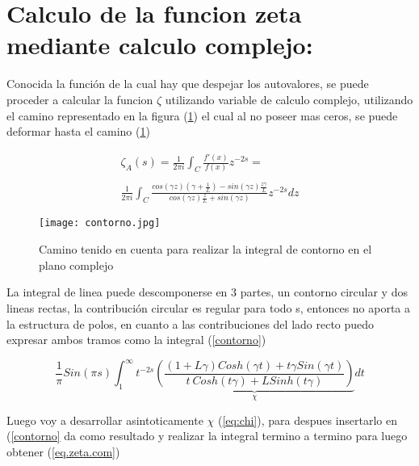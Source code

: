 \section{Calculo de la funcion zeta mediante calculo complejo:}

Conocida la función de la cual hay que despejar los autovalores, se puede proceder a calcular la funcion $\zeta$ utilizando variable de calculo complejo, utilizando el camino representado en la figura (\ref{fig:contorno}) el cual al no poseer mas ceros, se puede deformar hasta el camino (\ref{fig:contorno}) 

\begin{equation}
\begin{array}{c}
   \zeta _A (s) =  \frac{1}{2 \pi i} \int _{C} \frac{f'(x)}{f(x)} z ^{-2s} = \\ 
   \\ 
    \frac{1}{2 \pi i} \int _{C}
    \frac{ cos(\gamma z) \left(\gamma + \frac{1}{L} \right) - sin(\gamma z) \frac{z \gamma}{L}
    }
    {cos(\gamma z) \frac{z}{L} + sin(\gamma z)
    }
    z ^{-2 s} dz
\end{array}
\end{equation}




\begin{figure}
\centering
\texttt{[image: contorno.jpg]}
\caption{Camino tenido en cuenta para realizar la integral de contorno en el plano complejo}
\label{fig:contorno}
\end{figure}


La integral de linea puede descomponerse en 3 partes, un contorno circular y dos lineas rectas, la contribución circular es regular para todo s, entonces no aporta a la estructura de polos, en cuanto a las contribuciones del lado recto puedo expresar ambos tramos como la integral (\ref{contorno}) 

\begin{equation}
    \frac{1}{ \pi } 
    Sin(\pi s)
    \int _1 ^{\infty} 
    t ^{-2s}
    \underbrace{
    \left( 
    \frac{(1+L \gamma) Cosh( \gamma t)+ t \gamma Sin(\gamma t)}
    {t \ Cosh(t \gamma)+ L Sinh(t \gamma)}
    \right)} _{\chi}
    dt 
\label{contorno}
\end{equation}

Luego voy a desarrollar asintoticamente  $\chi$  (\ref{eq:chi}), para despues insertarlo en (\ref{contorno} da como resultado y realizar la integral termino a termino para luego obtener (\ref{eq.zeta.com})

